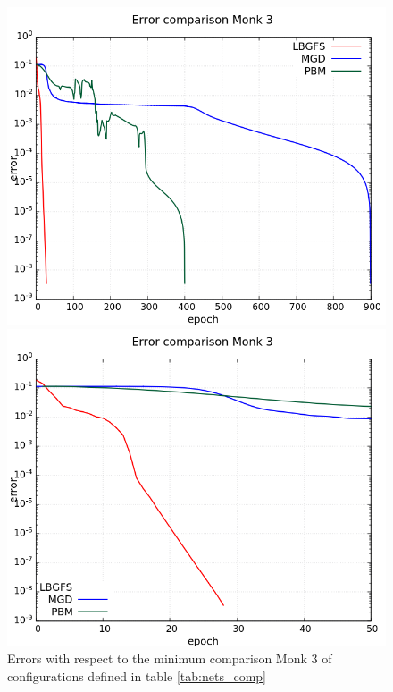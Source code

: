 \begin{figure}[H]
	\centering
	\begin{minipage}[t]{0.5\linewidth}
		\includegraphics[width=\linewidth]{data/Comparison/Monk3/Monk3_R_Comparison_log_standard.png}
	\end{minipage}%
	\begin{minipage}[t]{0.5\linewidth}
		\includegraphics[width=\linewidth]{data/Comparison/Monk3/Monk3_R_Comparison_log_zoom.png}
	\end{minipage}
	\caption{Errors with respect to the minimum comparison Monk 3 of configurations defined in table \ref{tab:nets_comp}}
	\label{R-Monk3}
\end{figure}